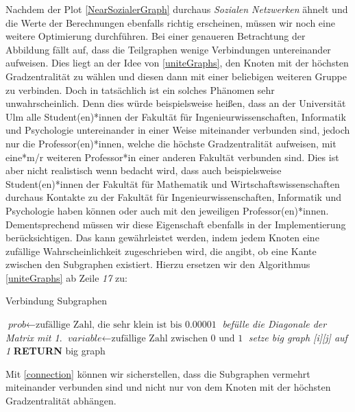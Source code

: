 \newpage
Nachdem der Plot \ref{NearSozialerGraph} durchaus \textit{Sozialen Netzwerken} ähnelt und die Werte der Berechnungen ebenfalls richtig erscheinen, müssen wir noch eine weitere Optimierung durchführen. Bei einer genaueren Betrachtung der Abbildung fällt auf, dass die Teilgraphen wenige Verbindungen untereinander aufweisen. Dies liegt an der Idee von \ref{uniteGraphs}, den Knoten mit der höchsten Gradzentralität zu wählen und diesen dann mit einer beliebigen weiteren Gruppe zu verbinden. Doch in tatsächlich ist ein solches Phänomen sehr unwahrscheinlich. Denn dies würde beispielsweise heißen, dass an der Universität Ulm alle Student(en)*innen der Fakultät für Ingenieurwissenschaften, Informatik und Psychologie untereinander in einer Weise miteinander verbunden sind, jedoch nur die Professor(en)*innen, welche die höchste Gradzentralität aufweisen, mit eine*m/r weiteren Professor*in einer anderen Fakultät verbunden sind. Dies ist aber nicht realistisch wenn bedacht wird, dass auch beispielsweise Student(en)*innen der Fakultät für Mathematik und Wirtschaftswissenschaften durchaus Kontakte zu der Fakultät für Ingenieurwissenschaften, Informatik und Psychologie haben können oder auch mit den jeweiligen Professor(en)*innen. Dementsprechend müssen wir diese Eigenschaft ebenfalls in der Implementierung berücksichtigen. Das kann gewährleistet werden, indem jedem Knoten eine zufällige Wahrscheinlichkeit zugeschrieben wird, die angibt, ob eine Kante zwischen den Subgraphen existiert. Hierzu ersetzen wir den Algorithmus \ref{uniteGraphs} ab Zeile \textit{17} zu:

\begin{algorithm}
\caption{Verbindung Subgraphen}\label{connection}
\begin{algorithmic}[1]
\State $\textit{prob} \gets \text{zufällige Zahl, die sehr klein ist bis 0.00001}$
\State \textit{befülle die Diagonale der Matrix mit 1}.
\EndFor
{}
\State $\textit{variable} \gets \text{zufällige Zahl zwischen 0 und 1}$
\State \textit{setze big graph [i][j] auf 1}
\EndIf
\EndFor
\EndFor
\textbf{RETURN} big graph
\EndProcedure
\end{algorithmic}
\end{algorithm}

Mit \ref{connection} können wir sicherstellen, dass die Subgraphen vermehrt miteinander verbunden sind und nicht nur von dem Knoten mit der höchsten Gradzentralität abhängen.

